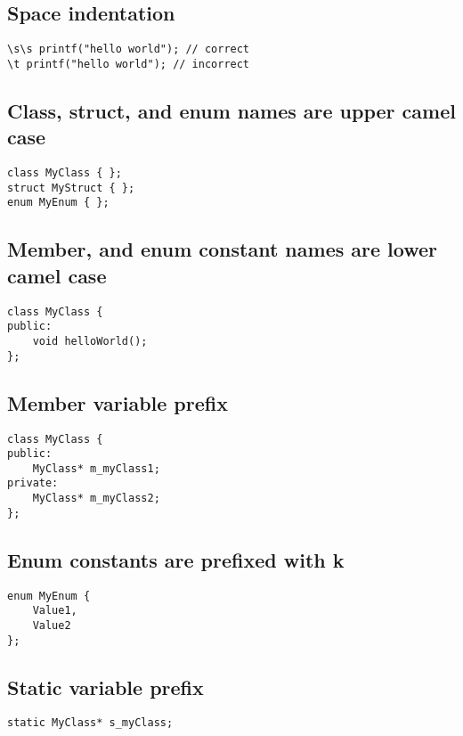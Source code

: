 \documentclass{article}
\begin{document}
\subsection{Space indentation}

\begin{verbatim}
\s\s printf("hello world"); // correct
\t printf("hello world"); // incorrect
\end{verbatim}

\subsection{Class, struct, and enum names are upper camel case}

\begin{verbatim}
class MyClass { };
struct MyStruct { };
enum MyEnum { };
\end{verbatim}

\subsection{Member, and enum constant names are lower camel case}

\begin{verbatim}
class MyClass {
public:
    void helloWorld();
};
\end{verbatim}

\subsection{Member variable prefix}

\begin{verbatim}
class MyClass {
public:
    MyClass* m_myClass1;
private:
    MyClass* m_myClass2;
};
\end{verbatim}

\subsection{Enum constants are prefixed with k}

\begin{verbatim}
enum MyEnum {
    Value1,
    Value2
};
\end{verbatim}

\subsection{Static variable prefix}

\begin{verbatim}
static MyClass* s_myClass;
\end{verbatim}
\end{document}
